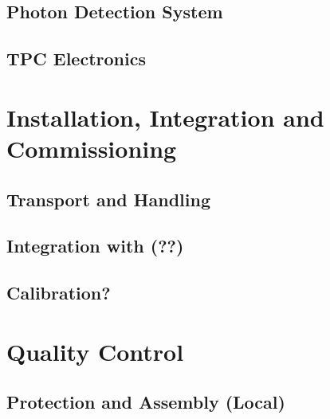 \subsection{Photon Detection System}
\label{sec:fddp-hv-intfc-pds}


\subsection{TPC Electronics}
\label{sec:fddp-hv-intfc-elec}



\section{Installation, Integration and Commissioning}
\label{sec:fddp-hv-install}

\subsection{Transport and Handling}
\label{sec:fddp-hv-install-transport}


\subsection{Integration with (??)}
\label{sec:fddp-hv-install-pds-elec}


\subsection{Calibration?}
\label{sec:fddp-hv-install-calib}



\section{Quality Control}
\label{sec:fddp-hv-qc}

\subsection{Protection and Assembly (Local)}
\label{sec:fddp-hv-qc-local}


